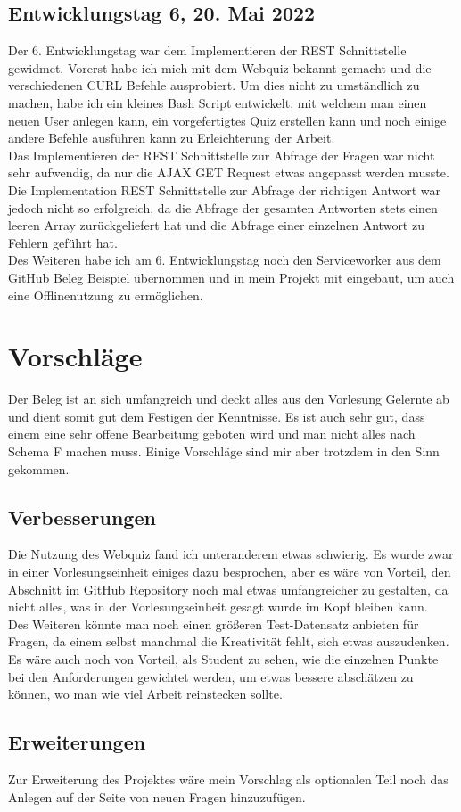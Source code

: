\documentclass[a4paper,12pt,titlepage]{scrartcl}
\begin{document}
        \subsection{Entwicklungstag 6, 20. Mai 2022}
            Der 6. Entwicklungstag war dem Implementieren der REST Schnittstelle gewidmet. Vorerst habe ich mich mit dem Webquiz bekannt gemacht und die verschiedenen CURL Befehle ausprobiert. Um dies nicht zu umständlich zu machen, habe ich ein kleines Bash Script entwickelt, mit welchem man einen neuen User anlegen kann, ein vorgefertigtes Quiz erstellen kann und noch einige andere Befehle ausführen kann zu Erleichterung der Arbeit.\\
            Das Implementieren der REST Schnittstelle zur Abfrage der Fragen war nicht sehr aufwendig, da nur die AJAX GET Request etwas angepasst werden musste. Die Implementation REST Schnittstelle zur Abfrage der richtigen Antwort war jedoch nicht so erfolgreich, da die Abfrage der gesamten Antworten stets einen leeren Array zurückgeliefert hat und die Abfrage einer einzelnen Antwort zu Fehlern geführt hat.\\
            Des Weiteren habe ich am 6. Entwicklungstag noch den Serviceworker aus dem GitHub Beleg Beispiel übernommen und in mein Projekt mit eingebaut, um auch eine Offlinenutzung zu ermöglichen.
    \newpage
    \section{Vorschläge}
        Der Beleg ist an sich umfangreich und deckt alles aus den Vorlesung Gelernte ab und dient somit gut dem Festigen der Kenntnisse. Es ist auch sehr gut, dass einem eine sehr offene Bearbeitung geboten wird und man nicht alles nach Schema F machen muss. Einige Vorschläge sind mir aber trotzdem in den Sinn gekommen.
        \subsection{Verbesserungen}
            Die Nutzung des Webquiz fand ich unteranderem etwas schwierig. Es wurde zwar in einer Vorlesungseinheit einiges dazu besprochen, aber es wäre von Vorteil, den Abschnitt im GitHub Repository noch mal etwas umfangreicher zu gestalten, da nicht alles, was in der Vorlesungseinheit gesagt wurde im Kopf bleiben kann.\\
            Des Weiteren könnte man noch einen größeren Test-Datensatz anbieten für Fragen, da einem selbst manchmal die Kreativität fehlt, sich etwas auszudenken.\\
            Es wäre auch noch von Vorteil, als Student zu sehen, wie die einzelnen Punkte bei den Anforderungen gewichtet werden, um etwas bessere abschätzen zu können, wo man wie viel Arbeit reinstecken sollte.
        \subsection{Erweiterungen}
            Zur Erweiterung des Projektes wäre mein Vorschlag als optionalen Teil noch das Anlegen auf der Seite von neuen Fragen hinzuzufügen.
    \newpage
\end{document}
